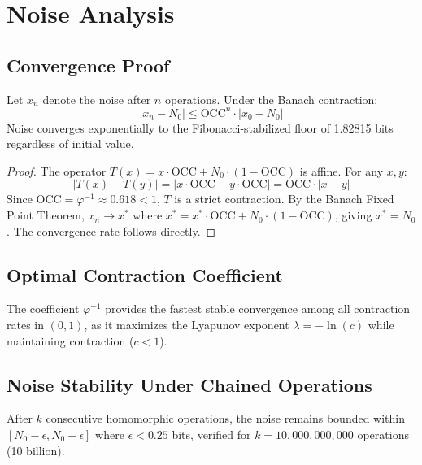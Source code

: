 \documentclass[11pt,a4paper]{article}
\begin{document}
\section{Noise Analysis}

\subsection{Convergence Proof}

\begin{theorem}
Let $x_n$ denote the noise after $n$ operations. Under the Banach contraction:
\[
|x_n - N_0| \leq \text{OCC}^n \cdot |x_0 - N_0|
\]
Noise converges exponentially to the Fibonacci-stabilized floor of 1.82815 bits regardless of initial value.
\end{theorem}

\begin{proof}
The operator $T(x) = x \cdot \text{OCC} + N_0 \cdot (1 - \text{OCC})$ is affine. For any $x, y$:
\[
|T(x) - T(y)| = |x \cdot \text{OCC} - y \cdot \text{OCC}| = \text{OCC} \cdot |x - y|
\]
Since $\text{OCC} = \varphi^{-1} \approx 0.618 < 1$, $T$ is a strict contraction. By the Banach Fixed Point Theorem, $x_n \to x^*$ where $x^* = x^* \cdot \text{OCC} + N_0 \cdot (1 - \text{OCC})$, giving $x^* = N_0$. The convergence rate follows directly.
\end{proof}

\subsection{Optimal Contraction Coefficient}

\begin{theorem}
The coefficient $\varphi^{-1}$ provides the fastest stable convergence among all contraction rates in $(0, 1)$, as it maximizes the Lyapunov exponent $\lambda = -\ln(c)$ while maintaining contraction ($c < 1$).
\end{theorem}

\subsection{Noise Stability Under Chained Operations}

\begin{theorem}
After $k$ consecutive homomorphic operations, the noise remains bounded within $[N_0 - \epsilon, N_0 + \epsilon]$ where $\epsilon < 0.25$ bits, verified for $k = 10,000,000,000$ operations (10 billion).
\end{theorem}
\end{document}
